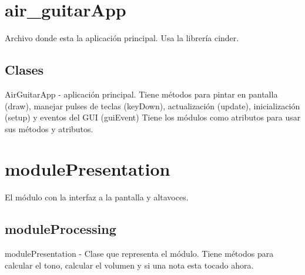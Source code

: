 \documentclass[a4paper,10pt]{article}
\begin{document}
\section{air\_guitarApp}
Archivo donde esta la aplicación principal. Usa la librería cinder.
\subsection{Clases}
AirGuitarApp - aplicación principal.
Tiene métodos para pintar en pantalla (draw), manejar pulses de teclas
(keyDown), actualización (update), inicialización (setup) y eventos del GUI
(guiEvent) Tiene los módulos como atributos para usar sus métodos y atributos.

\section{modulePresentation}
El módulo con la interfaz a la pantalla y altavoces.
\subsection{moduleProcessing}
modulePresentation - Clase que representa el módulo.
Tiene métodos para calcular el tono, calcular el volumen y si una nota esta
tocado ahora.
\end{document}
